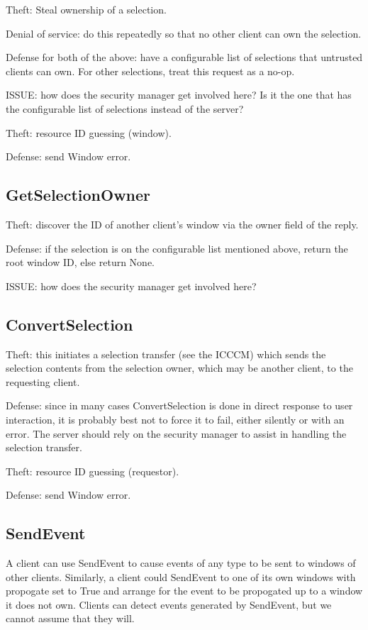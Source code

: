 Theft: Steal ownership of a selection.

Denial of service: do this repeatedly so that no other client can own
the selection.

Defense for both of the above: have a configurable list of selections
that untrusted clients can own.  For other selections, treat this
request as a no-op.

ISSUE: how does the security manager get involved here?  Is it the one
that has the configurable list of selections instead of the server?

Theft: resource ID guessing (window).

Defense: send Window error.



\subsection{GetSelectionOwner}

Theft: discover the ID of another client's window via the owner field
of the reply.

Defense: if the selection is on the configurable list mentioned above,
return the root window ID, else return None.

ISSUE: how does the security manager get involved here?



\subsection{ConvertSelection}

Theft: this initiates a selection transfer (see the ICCCM) which sends
the selection contents from the selection owner, which may be another
client, to the requesting client.

Defense: since in many cases ConvertSelection is done in direct
response to user interaction, it is probably best not to force it to
fail, either silently or with an error.  The server should rely on the
security manager to assist in handling the selection transfer.

Theft: resource ID guessing (requestor).

Defense: send Window error.



\subsection{SendEvent}

A client can use SendEvent to cause events of any type to be sent to
windows of other clients.  Similarly, a client could SendEvent to one
of its own windows with propogate set to True and arrange for the
event to be propogated up to a window it does not own.  Clients can
detect events generated by SendEvent, but we cannot assume that they
will.

